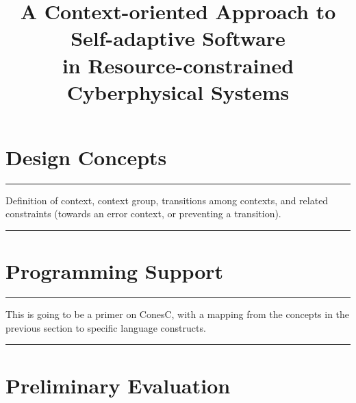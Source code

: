 \documentclass[10pt, conference, compsocconf]{IEEEtran}
\begin{document}
\title{A Context-oriented Approach to Self-adaptive Software\\ in Resource-constrained Cyberphysical Systems}


\author{}


\maketitle





\section{Design Concepts}
\label{sec:design}

\hrule
Definition of context, context group, transitions among contexts, and
related constraints (towards an error context, or preventing a
transition).
\hrule

\section{Programming Support}
\label{sec:conesc}

\hrule
This is going to be a primer on ConesC, with a mapping from the
concepts in the previous section to specific language constructs.
\hrule

\section{Preliminary Evaluation}
\label{sec:eval}
\end{document}
